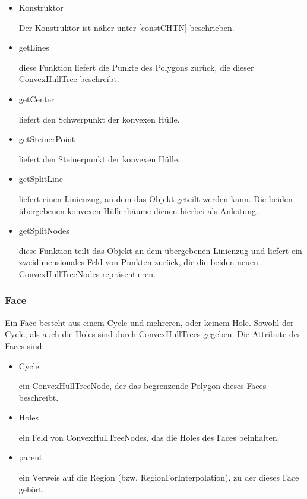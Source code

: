 \begin{itemize}
\item Konstruktor

Der Konstruktor ist näher unter \ref{constCHTN} beschrieben.

\item getLines

diese Funktion liefert die Punkte des Polygons zurück, die dieser ConvexHullTree beschreibt.

\item getCenter

liefert den Schwerpunkt der konvexen Hülle.

\item getSteinerPoint

liefert den Steinerpunkt der konvexen Hülle.

\item getSplitLine

liefert einen Linienzug, an dem das Objekt geteilt werden kann. Die beiden übergebenen konvexen Hüllenbäume dienen hierbei als Anleitung. 

\item getSplitNodes

diese Funktion teilt das Objekt an dem übergebenen Linienzug und liefert ein zweidimensionales Feld von Punkten zurück, die die beiden neuen ConvexHullTreeNodes repräsentieren.  

\end{itemize}


\subsubsection{Face}

Ein Face besteht aus einem Cycle und mehreren, oder keinem Hole. Sowohl der Cycle, als auch die Holes sind durch ConvexHullTrees gegeben. Die Attribute des Faces sind:

\begin{itemize}
\item Cycle

ein ConvexHullTreeNode, der das begrenzende Polygon dieses Faces beschreibt.

\item Holes

ein Feld von ConvexHullTreeNodes, das die Holes des Faces beinhalten.

\item parent

ein Verweis auf die Region (bzw. RegionForInterpolation), zu der dieses Face gehört.

\end{itemize}


